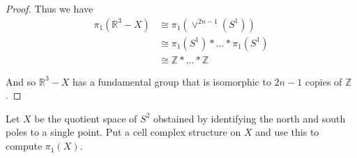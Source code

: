 \documentclass[12pt]{article}
\newenvironment{statement}[2][Statement]{\begin{trivlist}
\item[\hskip \labelsep {\bfseries #1}\hskip \labelsep {\bfseries #2.}]}{\end{trivlist}}
\begin{document}
\begin{proof}
  \par Thus we have 
  \begin{align*}
    \pi_1(\mathbb{R}^3-X) & \cong \pi_1(\vee^{2n-1}(S^1)) \\
                          & \cong \pi_1(S^1) \ast \dots \ast \pi_1(S^1) \\
                          & \cong \mathbb{Z} \ast \dots \ast \mathbb{Z}
  \end{align*}
  \par And so $\mathbb{R}^3 -X$ has a fundamental group that is isomorphic to $2n-1$ copies of $\mathbb{Z}$.
\end{proof}

\begin{statement}[Problem]{3}
  Let $X$ be the quotient space of $S^2$ obstained by identifying the north and south poles to a single point. Put a cell complex structure on 
  $X$ and use this to compute $\pi_1(X)$.
\end{statement}
\end{document}
